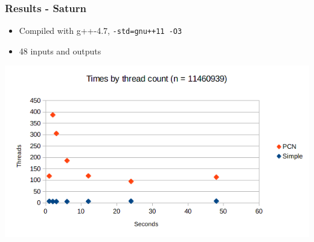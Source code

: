 \documentclass[notes=show]{beamer}
\begin{document}
\begin{frame}
\frametitle{Results - Saturn}
\begin{itemize}
\item Compiled with g++-4.7, \lstinline|-std=gnu++11 -O3|
\item 48 inputs and outputs
\end{itemize}

\includegraphics[width=\textwidth]{saturn}
\end{frame}

\end{document}
